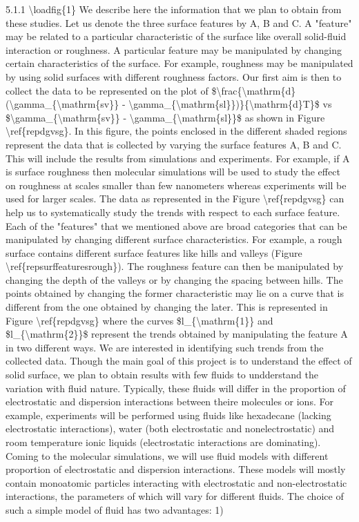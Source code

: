 \par 5.1.1 \textbackslash loadfig\{1\} We describe here the information that we plan to obtain from these studies. Let us denote the three surface features by A, B and C. A "feature" may be related to a particular characteristic of the surface like overall solid-fluid interaction or roughness. A particular feature may be manipulated by changing certain characteristics of the surface. For example, roughness may be manipulated by using solid surfaces with different roughness factors. Our first aim is then to collect the data to be represented on the plot of \$\textbackslash frac\{\textbackslash mathrm\{d\}(\textbackslash gamma\_\{\textbackslash mathrm\{sv\}\} - \textbackslash gamma\_\{\textbackslash mathrm\{sl\}\})\}\{\textbackslash mathrm\{d\}T\}\$ vs \$\textbackslash gamma\_\{\textbackslash mathrm\{sv\}\} - \textbackslash gamma\_\{\textbackslash mathrm\{sl\}\}\$ as shown in Figure \textbackslash ref\{repdgvsg\}. In this figure, the points enclosed in the different shaded regions represent the data that is collected by varying the surface features A, B and C. This will include the results from simulations and experiments. For example, if A is surface roughness then molecular simulations will be used to study the effect on roughness at scales smaller than few nanometers whereas experiments will be used for larger scales. The data as represented in the Figure \textbackslash ref\{repdgvsg\} can help us to systematically study the trends with respect to each surface feature. Each of the "features" that we mentioned above are broad categories that can be manipulated by changing different surface characteristics. For example, a rough surface contains  different surface features like hills and valleys (Figure \textbackslash ref\{repsurffeaturesrough\}). The roughness feature can then be manipulated by changing the depth of the valleys or by changing the spacing between hills. The points obtained by changing the former characteristic may lie on a curve that is different from the one obtained by changing the later. This is represented in Figure \textbackslash ref\{repdgvsg\} where the curves \$l\_\{\textbackslash mathrm\{1\}\} and \$l\_\{\textbackslash mathrm\{2\}\}\$ represent the trends obtained by manipulating the feature A in two different ways. We are interested in identifying such trends from the collected data. Though the main goal of this project is to understand the effect of solid surface, we plan to obtain results with few fluids to undderstand the variation with fluid nature. Typically, these fluids will differ in the proportion of electrostatic and dispersion interactions between theire molecules or ions. For example, experiments will be performed using fluids like hexadecane (lacking electrostatic interactions), water (both electrostatic and nonelectrostatic) and room temperature ionic liquids (electrostatic interactions are dominating). Coming to the molecular simulations, we will use fluid models with different proportion of electrostatic and dispersion interactions. These models will mostly contain monoatomic particles interacting with electrostatic and non-electrostatic interactions, the parameters of which will vary for different fluids. The choice of such a simple model of fluid has two advantages: 1) 